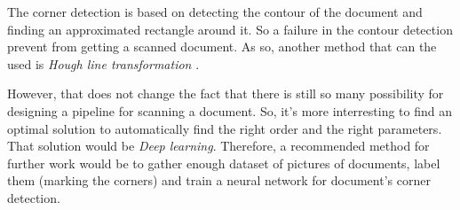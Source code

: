 \documentclass{scrartcl}
\begin{document}
  The corner detection is based on detecting the contour of the document and finding an
  approximated rectangle around it. So a failure in the contour detection prevent from getting
  a scanned document. As so, another method that can the used is
  \textit{Hough line transformation} \cite{cv-img-hough-transform}.

  However, that does not change the fact that there is still so many possibility for designing
  a pipeline for scanning a document. So, it's more interresting to find an optimal solution
  to automatically find the right order and the right parameters. That solution would be
  \textit{Deep learning}. Therefore, a recommended method for further work would be to
  gather enough dataset of pictures of documents, label them (marking the corners) and
  train a neural network for document's corner detection.

  \printbibliography
\end{document}
